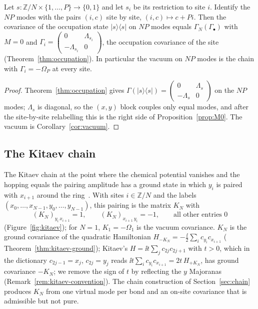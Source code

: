 \begin{theorem}\label{thm:product}
Let $s:\mathbb Z/N\times\{1,\ldots,P\}\to\{0,1\}$ and let $s_i$ be its restriction to
site $i$. Identify the $NP$ modes with the pairs $(i,c)$ site by site,
$(i,c)\mapsto c+Pi$. Then the covariance of the occupation state $|s\rangle\langle s|$ on
$NP$ modes equals $\Gamma_N(\Gamma_\bullet)$ with $M=0$ and
$\Gamma_i=\begin{pmatrix}0&\Lambda_{s_i}\\-\Lambda_{s_i}&0\end{pmatrix}$, the occupation
covariance of the site (Theorem~\ref{thm:occupation}). In particular the vacuum on $NP$
modes is the chain with $\Gamma_i=-\Omega_P$ at every site.
\end{theorem}
\begin{proof}
Theorem~\ref{thm:occupation} gives
$\Gamma(|s\rangle\langle s|)=\begin{pmatrix}0&\Lambda_s\\-\Lambda_s&0\end{pmatrix}$ on the
$NP$ modes; $\Lambda_s$ is diagonal, so the $(x,y)$ block couples only equal modes, and
after the site-by-site relabelling this is the right side of Proposition~\ref{prop:M0}.
The vacuum is Corollary~\ref{cor:vacuum}.
\end{proof}

\subsection{The Kitaev chain}
\label{sec:kitaev}
The Kitaev chain at the point where the chemical potential vanishes and the hopping equals
the pairing amplitude has a ground state in which $y_i$ is paired with $x_{i+1}$ around the
ring~\cite[Sec.~2]{kitaev}. With sites $i\in\mathbb Z/N$ and the labels
$(x_0,\ldots,x_{N-1},y_0,\ldots,y_{N-1})$, this pairing is the matrix $K_N$ with
\[
 (K_N)_{y_i\,x_{i+1}}=1,\qquad (K_N)_{x_{i+1}\,y_i}=-1,\qquad\text{all other entries }0
\]
(Figure~\ref{fig:kitaev}); for $N=1$, $K_1=-\Omega_1$ is the vacuum covariance. $K_N$ is the
ground covariance of the quadratic Hamiltonian
$H_{-K_N}=-\tfrac{\ii}{2}\sum_ic_{y_i}c_{x_{i+1}}$ ( Theorem~\ref{thm:kitaev-ground}); Kitaev's
$H=\ii t\sum_jc_{2j}c_{2j+1}$ with $t>0$, which in the dictionary $c_{2j-1}=x_j$, $c_{2j}=y_j$
reads $\ii t\sum_ic_{y_i}c_{x_{i+1}}=2t\,H_{+K_N}$, has ground covariance $-K_N$; we remove the sign of $t$
by reflecting the $y$ Majoranas (Remark~\ref{rem:kitaev-convention}). The chain construction of
Section~\ref{sec:chain} produces $K_N$ from one virtual mode per bond and an on-site
covariance that is admissible but not pure.

